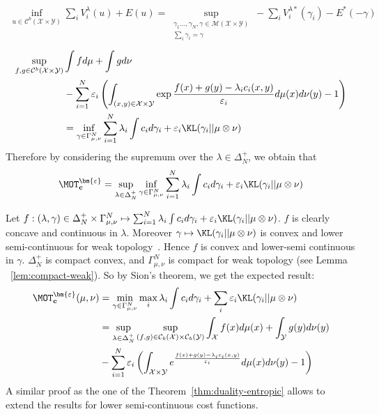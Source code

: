 \begin{prv*}
\begin{align*}
\inf_{u\in \mathcal{C}^b(\mathcal{X}\times\mathcal{Y})} \sum_i V_i^{\lambda}(u) + E(u) = \sup\limits_{\substack{\gamma_1...,\gamma_N,\gamma\in \mathcal{M}(\mathcal{X}\times\mathcal{Y})\\\sum_i \gamma_i = \gamma}}-\sum_i V_i^{\lambda*}(\gamma_i)-E^*(-\gamma)
\end{align*}
\begin{align*}
\sup\limits_{f,g\in \mathcal{C}^b(\mathcal{X}\times\mathcal{Y})}&\int fd\mu+\int gd\nu \\
& - \sum_{i=1}^N \varepsilon_i\left(\int_{(x,y)\in\mathcal{X}\times\mathcal{Y}} \exp{\frac{f(x)+g(y)-\lambda_ic_i(x,y)}{\varepsilon_i}}d\mu(x)d\nu(y)-1\right)\\
&= \inf_{\gamma\in\Gamma^N_{\mu,\nu}} \sum_{i=1}^N \lambda_i\int c_i d\gamma_i + \varepsilon_i\KL(\gamma_i||\mu\otimes\nu)
\end{align*}
Therefore by considering the supremum over the $\lambda\in\Delta_N^{+}$, we obtain that
\begin{align*}
    \MOT_{\mathbf{c}}^{\bm{\varepsilon}}=\sup_{\lambda\in\Delta_N^{+}}\inf_{\gamma\in\Gamma^N_{\mu,\nu}} \sum_{i=1}^N \lambda_i\int c_i d\gamma_i + \varepsilon_i \KL(\gamma_i||\mu\otimes\nu)
\end{align*}


Let $f: (\lambda,\gamma)\in\Delta_N^{+}\times\Gamma^N_{\mu,\nu}\mapsto\sum_{i=1}^N \lambda_i\int c_i d\gamma_i + \varepsilon_i \KL(\gamma_i||\mu\otimes\nu)$. $f$ is clearly concave and continuous in $\lambda$. Moreover $\gamma\mapsto \KL(\gamma_i||\mu\otimes\nu)$ is convex and lower semi-continuous for weak topology~\citep[Lemma 1.4.3]{dupuis2011weak}. Hence $f$ is convex and lower-semi continuous in $\gamma$. $\Delta_N^{+}$ is compact convex, and  $\Gamma^N_{\mu,\nu}$ is compact for weak topology (see  Lemma
~\ref{lem:compact-weak}). So by Sion's theorem,  we get the expected  result:
\begin{align*}
    \MOT_{\mathbf{c}}^{\bm{\varepsilon}}(\mu,\nu)&=\min_{\gamma\in\Gamma^N_{\mu,\nu}} \max_i\lambda_i\int c_i d\gamma_i + \sum_i\varepsilon_i \KL(\gamma_i||\mu\otimes\nu)\\
    &=\sup_{\lambda\in\Delta_N^{+}} \sup_{(f,g)\in\mathcal{C}_b(\mathcal{X})\times\mathcal{C}_b(\mathcal{Y})}\int_{\mathcal{X}} f(x)d\mu(x)+ \int_{\mathcal{Y}} g(y)d\nu(y)\\
&-\sum_{i=1}^N\varepsilon_i\left( \int_{\mathcal{X}\times\mathcal{Y}} e^{\frac{f(x)+g(y)-\lambda_ic_i(x,y)}{\varepsilon_i}} d\mu(x)d\nu(y)-1\right)
\end{align*}
A similar proof as the one of the Theorem~\ref{thm:duality-entropic} allows to extend the results for lower semi-continuous cost functions.
\end{prv*}
